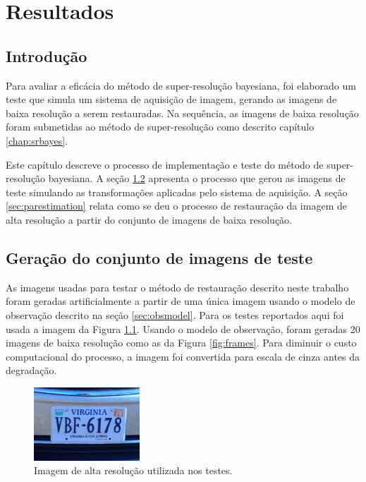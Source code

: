 \chapter{Resultados}
\label{chap:resultados}
\section{Introdução}
Para avaliar a eficácia do método de super-resolução bayesiana, 
foi elaborado um teste que simula um sistema de aquisição de imagem,
gerando as imagens de baixa resolução a serem restauradas.
Na sequência, as imagens de baixa resolução foram submetidas ao método de super-resolução como descrito capítulo \ref{chap:srbayes}.

Este capítulo descreve o processo de implementação e teste do método de super-resolução bayesiana.
A seção \ref{sec:gerimagens} apresenta o processo que gerou as imagens de teste simulando as transformações aplicadas pelo sistema de aquisição.
A seção \ref{sec:parestimation} relata como se deu o processo de restauração da imagem de alta resolução a partir do conjunto de imagens de baixa resolução.

\section{Geração do conjunto de imagens de teste}
\label{sec:gerimagens}
As imagens usadas para testar o método de restauração descrito neste trabalho foram geradas artificialmente a partir de uma única imagem usando o modelo de observação descrito na seção \ref{sec:obsmodel}.
Para os testes reportados aqui foi usada a imagem da Figura \ref{fig:hrimage}.
Usando o modelo de observação, foram geradas 20 imagens de baixa resolução como as da Figura \ref{fig:frames}.
Para diminuir o custo computacional do processo, a imagem foi convertida para escala de cinza antes da degradação.

\begin{figure}[h]
	\centering
	\includegraphics{figures/imtestes.png}
	\caption{Imagem de alta resolução utilizada nos testes.}
	\label{fig:hrimage}

\end{figure}

